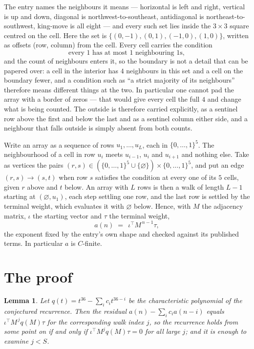 \documentclass[11pt,a4paper]{article}
\theoremstyle{plain}
\newtheorem{lemma}[theorem]{Lemma}
\theoremstyle{definition}
\begin{document}
The entry names the neighbours it means --- horizontal is left and right, vertical is up and
down, diagonal is northwest-to-southeast, antidiagonal is northeast-to-southwest, king-move is
all eight --- and every such set lies inside the $3\times3$ square centred on the cell. Here
the set is $\{(0,-1), (0,1), (-1,0), (1,0)\}$, written as offsets (row, column) from the cell. Every cell carries
the condition
\[
\text{every 1 has at most 1 neighbouring 1s},
\]
and the count of neighbours enters it, so the boundary is not a detail that can be papered
over: a cell in the interior has $4$ neighbours in this set and a cell on the boundary
fewer, and a condition such as ``a strict majority of its neighbours'' therefore means
different things at the two. In particular one cannot pad the array with a border of zeros ---
that would give every cell the full $4$ and change what is being counted. The outside is
therefore carried
explicitly, as a sentinel row above the first and below the last and as a sentinel column
either side, and a neighbour that falls outside is simply absent from both counts.

Write an array as a sequence of rows $u_1,\dots,u_L$, each in
$\{0,\dots,1\}^{5}$. The neighbourhood of a cell in row $u_i$ meets $u_{i-1}$,
$u_i$ and $u_{i+1}$ and nothing else. Take as vertices the pairs
$(r,s)\in(\{0,\dots,1\}^{5}\cup\{\varnothing\})\times\{0,\dots,1\}^{5}$,
and put an edge $(r,s)\to(s,t)$ when row $s$ satisfies the condition at every one of its
$5$ cells, given $r$ above and $t$ below. An array with $L$ rows is then a walk of length
$L-1$ starting at $(\varnothing,u_1)$, each step settling one row, and the last row is
settled by the terminal weight, which evaluates it with $\varnothing$ below. Hence,
with $M$ the adjacency matrix, $\iota$ the starting vector and $\tau$ the terminal weight,
\[
a(n)\;=\;\,\iota^{\!\top}M^{\,n-1}\tau ,
\]
the exponent fixed by the entry's own shape and checked against its published terms. In
particular $a$ is $C$-finite.

\section{The proof}

\begin{lemma}\label{lem:crit}
Let $q(t)=t^{36}-\sum_i c_it^{36-i}$ be the characteristic polynomial of the
conjectured recurrence. Then the residual $a(n)-\sum_ic_ia(n-i)$ equals
$\iota^{\!\top}M^{\,j}q(M)\tau$ for the corresponding walk index $j$, so the
recurrence holds from some point on if and only if $\iota^{\!\top}M^{j}q(M)\tau=0$ for all
large $j$; and it is enough to examine $j<S$.
\end{lemma}
\end{document}
